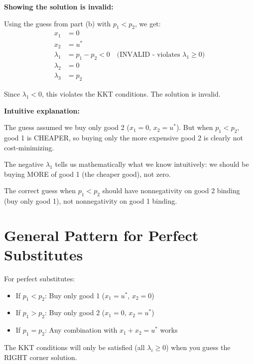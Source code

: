 \documentclass[11pt]{article}
\begin{document}
\begin{tcolorbox}[colback=blue!5!white,colframe=blue!75!black,title=Problem 2c Answer]

\textbf{Showing the solution is invalid:}

Using the guess from part (b) with $p_1 < p_2$, we get:
\begin{align}
x_1 &= 0 \\
x_2 &= u^* \\
\lambda_1 &= p_1 - p_2 < 0 \quad \text{(INVALID - violates $\lambda_1 \geq 0$)} \\
\lambda_2 &= 0 \\
\lambda_3 &= p_2
\end{align}

Since $\lambda_1 < 0$, this violates the KKT conditions. The solution is invalid.

\textbf{Intuitive explanation:}

The guess assumed we buy only good 2 ($x_1 = 0$, $x_2 = u^*$). But when $p_1 < p_2$, good 1 is CHEAPER, so buying only the more expensive good 2 is clearly not cost-minimizing.

The negative $\lambda_1$ tells us mathematically what we know intuitively: we should be buying MORE of good 1 (the cheaper good), not zero.

The correct guess when $p_1 < p_2$ should have nonnegativity on good 2 binding (buy only good 1), not nonnegativity on good 1 binding.

\end{tcolorbox}

\section{General Pattern for Perfect Substitutes}

\begin{tcolorbox}[colback=yellow!10!white,colframe=orange!75!black,title=The Rule]
For perfect substitutes:
\begin{itemize}
\item If $p_1 < p_2$: Buy only good 1 ($x_1 = u^*$, $x_2 = 0$)
\item If $p_1 > p_2$: Buy only good 2 ($x_1 = 0$, $x_2 = u^*$)
\item If $p_1 = p_2$: Any combination with $x_1 + x_2 = u^*$ works
\end{itemize}

The KKT conditions will only be satisfied (all $\lambda_i \geq 0$) when you guess the RIGHT corner solution.
\end{tcolorbox}
\end{document}
